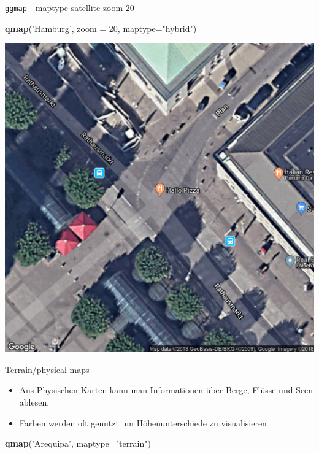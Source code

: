 \documentclass[ignorenonframetext,]{beamer}
\newenvironment{Shaded}{\begin{snugshade}}{\end{snugshade}}
\newcommand{\KeywordTok}[1]{\textcolor[rgb]{0.13,0.29,0.53}{\textbf{#1}}}
\newcommand{\DataTypeTok}[1]{\textcolor[rgb]{0.13,0.29,0.53}{#1}}
\newcommand{\DecValTok}[1]{\textcolor[rgb]{0.00,0.00,0.81}{#1}}
\newcommand{\StringTok}[1]{\textcolor[rgb]{0.31,0.60,0.02}{#1}}
\newcommand{\NormalTok}[1]{#1}
\begin{document}
\begin{frame}[fragile]{\texttt{ggmap} - maptype satellite zoom 20}

\begin{Shaded}
\begin{Highlighting}[]
\KeywordTok{qmap}\NormalTok{(}\StringTok{'Hamburg'}\NormalTok{, }\DataTypeTok{zoom =} \DecValTok{20}\NormalTok{, }\DataTypeTok{maptype=}\StringTok{"hybrid"}\NormalTok{)}
\end{Highlighting}
\end{Shaded}

\includegraphics{figure/ham_map.pdf}

\end{frame}

\begin{frame}[fragile]{Terrain/physical maps}

\begin{itemize}
\item
  Aus Physischen Karten kann man Informationen über Berge, Flüsse und
  Seen ablesen.
\item
  Farben werden oft genutzt um Höhenunterschiede zu visualisieren
\end{itemize}

\begin{Shaded}
\begin{Highlighting}[]
\KeywordTok{qmap}\NormalTok{(}\StringTok{'Arequipa'}\NormalTok{, }\DataTypeTok{maptype=}\StringTok{"terrain"}\NormalTok{)}
\end{Highlighting}
\end{Shaded}

\end{frame}
\end{document}
